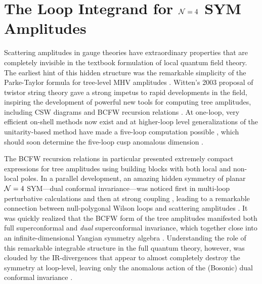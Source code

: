 \documentclass[11pt, reqno]{article}
\begin{document}
\begin{titlepage}
\begin{abstract}
\end{abstract}

\bigskip
\bigskip


\end{titlepage}

\tableofcontents
\newpage

\section{The Loop Integrand for ${\cal N} = 4$ SYM Amplitudes}

Scattering amplitudes in gauge theories have extraordinary properties that are completely invisible in the textbook formulation of local quantum field theory. The earliest hint of this hidden structure was the remarkable simplicity of the Parke-Taylor formula for tree-level MHV amplitudes \cite{Parke:1986gb,Berends:1987me}. Witten's 2003 proposal of twistor string theory \cite{Witten:2003nn} gave a strong impetus to rapid developments in the field, inspiring the development of powerful new tools for computing tree amplitudes, including CSW diagrams \cite{Cachazo:2004kj} and BCFW  recursion relations \cite{Britto:2004ap, Britto:2005fq, Brandhuber:2008pf, ArkaniHamed:2008gz}. At one-loop, very efficient on-shell methods now exist \cite{Bern:2007dw, Berger:2008sj} and at higher-loop level generalizations of the unitarity-based method \cite{Bern:1994zx,Bern:1994cg,Bern:1996je,Bern:2004cz} have made a five-loop computation possible \cite{Bern:2007ct}, which should soon determine the five-loop cusp anomalous dimension \cite{fiveloopinProgress}. 

The BCFW recursion relations in particular presented extremely compact expressions for tree amplitudes using building blocks with both local and non-local poles. In a parallel development, an amazing hidden symmetry of planar ${\cal N}=4$ SYM---dual conformal invariance---was noticed first in multi-loop perturbative calculations \cite{Drummond:2006rz} and then at strong coupling \cite{Alday:2007hr}, leading to a remarkable connection between null-polygonal Wilson loops and scattering amplitudes \cite{Alday:2007hr,Alday:2007he,Brandhuber:2007yx,Drummond:2007aua,Drummond:2007cf,Drummond:2007bm,Drummond:2008aq,
Bern:2008ap,Drummond:2008vq,Alday:2009yn}. It was quickly realized that the BCFW form of the tree amplitudes manifested both full superconformal and {\it dual} superconformal invariance, which together close into an infinite-dimensional Yangian symmetry algebra \cite{Drummond:2009fd}.  Understanding the role of this remarkable integrable structure in the full quantum theory, however, was clouded by the IR-divergences that appear to almost completely destroy the symmetry at loop-level, leaving only the anomalous action of the (Bosonic) dual conformal invariance \cite{Drummond:2007au,Brandhuber:2009xz,Brandhuber:2009kh,Elvang:2009ya}.
\end{document}
